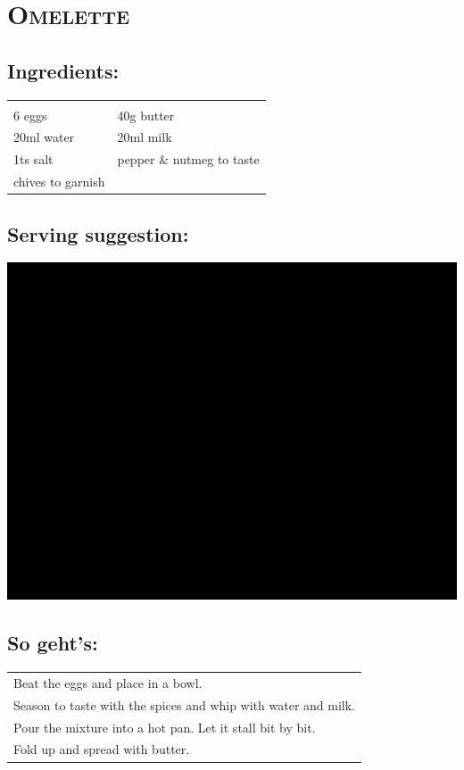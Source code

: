 \section{\textsc{Omelette}}

\subsection*{Ingredients:}

\begin{tabular}{p{7.5cm} p{7.5cm}}
	& \\
	6 eggs & 40g butter \\
	20ml water & 20ml milk \\
  1ts salt & pepper \& nutmeg to taste \\
  chives to garnish &
\end{tabular}

\subsection*{Serving suggestion:}

\includegraphics[width=\textwidth]{img/ph.jpg} \cite{omlett}

\subsection*{So geht's:}

\begin{tabular}{p{15cm}}
	\\
  Beat the eggs and place in a bowl.\\
  Season to taste with the spices and whip with water and milk.\\
  Pour the mixture into a hot pan. Let it stall bit by bit.\\
  Fold up and spread with butter.
\end{tabular}
